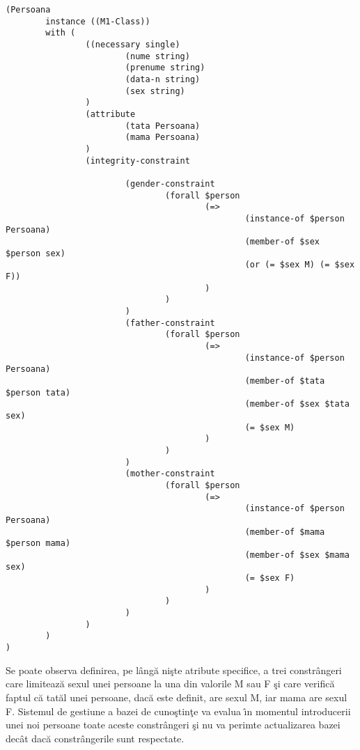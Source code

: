 \documentclass{article}
\begin{document}
{\scriptsize
\begin{verbatim}
(Persoana
        instance ((M1-Class))
        with (
                ((necessary single)
                        (nume string)
                        (prenume string)
                        (data-n string)
                        (sex string)
                )
                (attribute
                        (tata Persoana)
                        (mama Persoana)
                )
                (integrity-constraint

                        (gender-constraint
                                (forall $person
                                        (=>
                                                (instance-of $person Persoana)
                                                (member-of $sex $person sex) 
                                                (or (= $sex M) (= $sex F))
                                        )
                                )
                        )
                        (father-constraint
                                (forall $person
                                        (=>
                                                (instance-of $person Persoana)
                                                (member-of $tata $person tata)
                                                (member-of $sex $tata sex)
                                                (= $sex M)
                                        )
                                )
                        )
                        (mother-constraint
                                (forall $person
                                        (=>
                                                (instance-of $person Persoana)
                                                (member-of $mama $person mama)
                                                (member-of $sex $mama sex)
                                                (= $sex F)
                                        )
                                )
                        )
                )
        )
)
\end{verbatim}
}

Se poate observa definirea, pe l\^{a}ng\u{a} ni\c{s}te atribute specifice,
a trei constr\^{a}ngeri care limiteaz\u{a} sexul unei persoane la una din
valorile M sau F \c{s}i care verific\u{a} faptul c\u{a} tat\u{a}l unei
persoane, dac\u{a} este definit, are sexul M, iar mama are sexul F. Sistemul
de gestiune a bazei de cuno\c{s}tin\c{t}e va evalua \^{\i}n momentul introducerii
unei noi persoane toate aceste constr\^{a}ngeri \c{s}i nu va perimte
actualizarea bazei dec\^{a}t dac\u{a} constr\^{a}ngerile sunt respectate.
\end{document}
